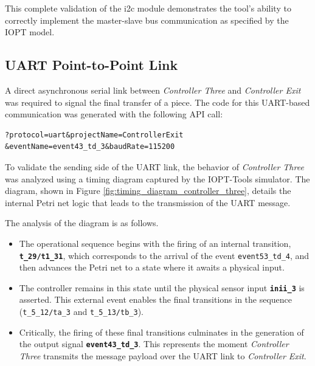 This complete validation of the \gls{i2c} module demonstrates the tool's ability to correctly implement the master-slave bus communication as specified by the IOPT model.



\subsection{UART Point-to-Point Link}
\label{subsec:uart_implementation}

A direct asynchronous serial link between \textit{Controller Three} and \textit{Controller Exit} was required to signal the final transfer of a piece. The code for this UART-based communication was generated with the following API call:

\begin{verbatim}
?protocol=uart&projectName=ControllerExit
&eventName=event43_td_3&baudRate=115200
\end{verbatim}

To validate the sending side of the UART link, the behavior of \textit{Controller Three} was analyzed using a timing diagram captured by the IOPT-Tools simulator. The diagram, shown in Figure \ref{fig:timing_diagram_controller_three}, details the internal Petri net logic that leads to the transmission of the UART message.

The analysis of the diagram is as follows.
\begin{itemize}
    \item The operational sequence begins with the firing of an internal transition, \textbf{\texttt{t\_29/t1\_31}}, which corresponds to the arrival of the event \texttt{event53\_td\_4}, and then advances the Petri net to a state where it awaits a physical input.
    
    \item The controller remains in this state until the physical sensor input \textbf{\texttt{inii\_3}} is asserted. This external event enables the final transitions in the sequence (\texttt{t\_5\_12/ta\_3} and \texttt{t\_5\_13/tb\_3}).
    
    \item Critically, the firing of these final transitions culminates in the generation of the output signal \textbf{\texttt{event43\_td\_3}}. This represents the moment \textit{Controller Three} transmits the message payload over the UART link to \textit{Controller Exit}.
\end{itemize}

